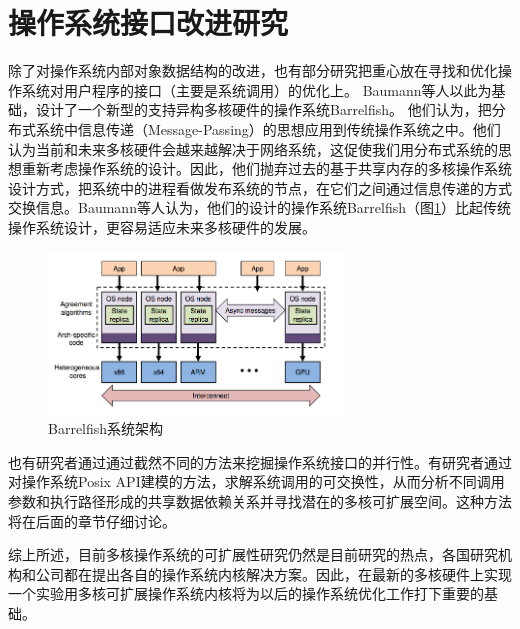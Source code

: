 \section{操作系统接口改进研究}
除了对操作系统内部对象数据结构的改进，也有部分研究把重心放在寻找和优化操作系统对用户程序的接口（主要是系统调用）的优化上。
Baumann等人以此为基础，设计了一个新型的支持异构多核硬件的操作系统Barrelfish\cite{Baumann:2009:MNO:1629575.1629579}。
他们认为，把分布式系统中信息传递（Message-Passing）的思想应用到传统操作系统之中。他们认为当前和未来多核硬件会越来越解决于网络系统，这促使我们用分布式系统的思想重新考虑操作系统的设计。因此，他们抛弃过去的基于共享内存的多核操作系统设计方式，把系统中的进程看做发布系统的节点，在它们之间通过信息传递的方式交换信息。Baumann等人认为，他们的设计的操作系统Barrelfish（图\ref{fig:barrelfish}）比起传统操作系统设计，更容易适应未来多核硬件的发展。

\begin{figure}[ht]
\begin{center}
\includegraphics[width=0.7\textwidth]{figures/barrelfish.png}
\end{center}
\caption{Barrelfish系统架构\cite{Baumann:2009:MNO:1629575.1629579}}
\label{fig:barrelfish}
\end{figure}

也有研究者通过通过截然不同的方法来挖掘操作系统接口的并行性。有研究者\cite{commuter:2013}通过对操作系统Posix API建模的方法，求解系统调用的可交换性，从而分析不同调用参数和执行路径形成的共享数据依赖关系并寻找潜在的多核可扩展空间。这种方法将在后面的章节仔细讨论。

综上所述，目前多核操作系统的可扩展性研究仍然是目前研究的热点，各国研究机构和公司都在提出各自的操作系统内核解决方案。因此，在最新的多核硬件上实现一个实验用多核可扩展操作系统内核将为以后的操作系统优化工作打下重要的基础。


